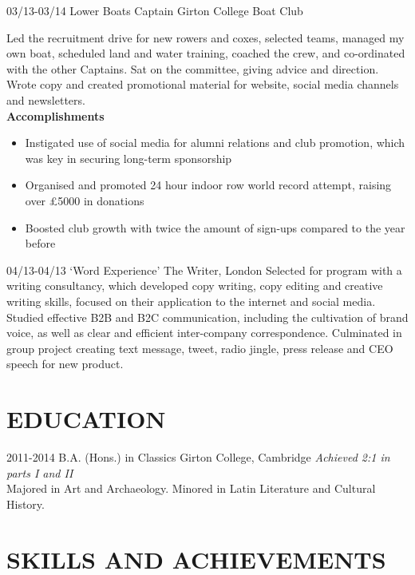\documentclass[]{friggeri-cv}
\begin{document}
   \begin{entrylist} 
  \entry
  {03/13-03/14}
  {Lower Boats Captain}
  {Girton College Boat Club}
  {Led the recruitment drive for new rowers and coxes, selected teams, managed my own boat, scheduled land and water training, coached the crew, and co-ordinated with the other Captains. Sat on the committee, giving advice and direction. Wrote copy and created promotional material for website, social media channels and newsletters. \\
  	\textbf{Accomplishments}
  	\begin{itemize}
  		\item Instigated use of social media for alumni relations and club promotion, which was key in securing long-term sponsorship
  		\item Organised and promoted 24 hour indoor row world record attempt, raising over £5000 in donations
  		\item Boosted club growth with twice the amount of sign-ups compared to the year before
  	\end{itemize}
  }
  \end{entrylist}
  \begin{entrylist}
  \entry
  {04/13-04/13}
  {‘Word Experience’}
  {The Writer, London}
  {Selected for program with a writing consultancy, which developed copy writing, copy editing and creative writing skills, focused on their application to the internet and social media. Studied effective B2B and B2C communication, including the cultivation of brand voice, as well as clear and efficient inter-company correspondence. Culminated in group project creating text message, tweet, radio jingle, press release and CEO speech for new product.}
 
\end{entrylist}

\section{EDUCATION}

\begin{entrylist}
	\entry
	{2011-2014}
	{B.A. (Hons.) in Classics}
	{Girton College, Cambridge}
	{\emph{Achieved 2:1 in parts I and II}
	\\
	
	Majored in Art and Archaeology. Minored in Latin Literature and Cultural History.}
\end{entrylist}

\section{SKILLS AND ACHIEVEMENTS}
\end{document}

